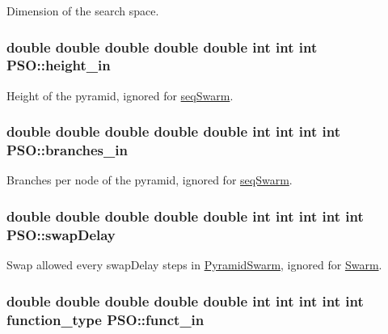 Dimension of the search space. 

\hypertarget{classPSO_ee0432eff40a83e317cec0948a6b84b6}{
\subsubsection{\setlength{\rightskip}{0pt plus 5cm}double double double double double int int int {\bf PSO::height\_\-in}}}
\label{classPSO_ee0432eff40a83e317cec0948a6b84b6}


Height of the pyramid, ignored for \hyperlink{pso_8h_42bcedc2c7cf9459c9669f9df4f61ebdde370d79b6c81ecae74ad5b24383eeca}{seqSwarm}. 

\hypertarget{classPSO_97fa3e1fd7cd363e203af942f79c75e8}{
\subsubsection{\setlength{\rightskip}{0pt plus 5cm}double double double double double int int int int {\bf PSO::branches\_\-in}}}
\label{classPSO_97fa3e1fd7cd363e203af942f79c75e8}


Branches per node of the pyramid, ignored for \hyperlink{pso_8h_42bcedc2c7cf9459c9669f9df4f61ebdde370d79b6c81ecae74ad5b24383eeca}{seqSwarm}. 

\hypertarget{classPSO_4c7660d6fa0c98028ac4f3bb1cd70d1d}{
\subsubsection{\setlength{\rightskip}{0pt plus 5cm}double double double double double int int int int int {\bf PSO::swapDelay}}}
\label{classPSO_4c7660d6fa0c98028ac4f3bb1cd70d1d}


Swap allowed every swapDelay steps in \hyperlink{classPyramidSwarm}{PyramidSwarm}, ignored for \hyperlink{classSwarm}{Swarm}. 

\hypertarget{classPSO_8299ea6538ac64b56eee6f501dfac3b2}{
\subsubsection{\setlength{\rightskip}{0pt plus 5cm}double double double double double int int int int int {\bf function\_\-type} {\bf PSO::funct\_\-in}}}
\label{classPSO_8299ea6538ac64b56eee6f501dfac3b2}


